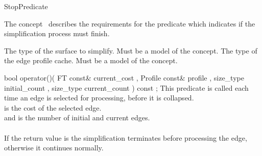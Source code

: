 
\begin{ccRefConcept}{StopPredicate}


\ccDefinition

The concept \ccRefName\ describes the requirements for the predicate which indicates if the simplification process must finish.

\ccTypes
  {The type of the surface to simplify. Must be a model of the  concept.}{}
\ccGlue    
\ccGlue    
\ccGlue    
  {The type of the edge profile cache. Must be a model of the  concept.}{}

\ccCreation
{}  %

\ccOperations

  \ccMethod
    {bool operator()( FT const&       current_cost
                    , Profile  const& profile
                    , size_type       initial_count
                    , size_type       current_count
                    ) const ;
    }
    {
    This predicate is called each time an edge is selected for processing,
    before it is collapsed.\\
     is the cost of the selected edge.\\
     and  is the number of initial and current edges.\\
    \\
    If the return value is  the simplification terminates before processing the edge,
    otherwise it continues normally.
    }
  
\ccHasModels
{}

\end{ccRefConcept}


